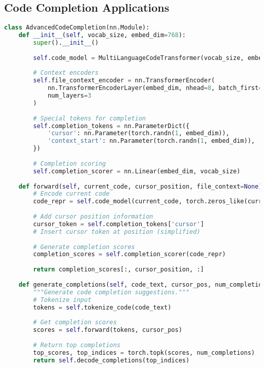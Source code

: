 \subsection{Code Completion Applications}

\begin{lstlisting}[language=Python, caption=Advanced code completion system]
class AdvancedCodeCompletion(nn.Module):
    def __init__(self, vocab_size, embed_dim=768):
        super().__init__()
        
        self.code_model = MultiLanguageCodeTransformer(vocab_size, embed_dim)
        
        # Context encoders
        self.file_context_encoder = nn.TransformerEncoder(
            nn.TransformerEncoderLayer(embed_dim, nhead=8, batch_first=True),
            num_layers=3
        )
        
        # Special tokens for completion
        self.completion_tokens = nn.ParameterDict({
            'cursor': nn.Parameter(torch.randn(1, embed_dim)),
            'context_start': nn.Parameter(torch.randn(1, embed_dim)),
        })
        
        # Completion scoring
        self.completion_scorer = nn.Linear(embed_dim, vocab_size)
    
    def forward(self, current_code, cursor_position, file_context=None):
        # Encode current code
        code_repr = self.code_model(current_code, torch.zeros_like(current_code))
        
        # Add cursor position information
        cursor_token = self.completion_tokens['cursor']
        # Insert cursor token at position (simplified)
        
        # Generate completion scores
        completion_scores = self.completion_scorer(code_repr)
        
        return completion_scores[:, cursor_position, :]
    
    def generate_completions(self, code_text, cursor_pos, num_completions=5):
        """Generate code completion suggestions."""
        # Tokenize input
        tokens = self.tokenize_code(code_text)
        
        # Get completion scores
        scores = self.forward(tokens, cursor_pos)
        
        # Return top completions
        top_scores, top_indices = torch.topk(scores, num_completions)
        return self.decode_completions(top_indices)
\end{lstlisting}

